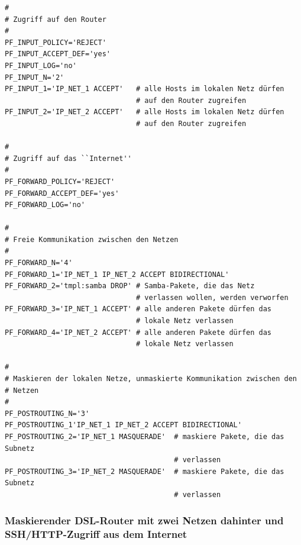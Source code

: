 \begin{example}
\begin{verbatim}
#
# Zugriff auf den Router
#
PF_INPUT_POLICY='REJECT'
PF_INPUT_ACCEPT_DEF='yes'
PF_INPUT_LOG='no'
PF_INPUT_N='2'
PF_INPUT_1='IP_NET_1 ACCEPT'   # alle Hosts im lokalen Netz dürfen
                               # auf den Router zugreifen
PF_INPUT_2='IP_NET_2 ACCEPT'   # alle Hosts im lokalen Netz dürfen
                               # auf den Router zugreifen

#
# Zugriff auf das ``Internet''
#
PF_FORWARD_POLICY='REJECT'
PF_FORWARD_ACCEPT_DEF='yes'
PF_FORWARD_LOG='no'

#
# Freie Kommunikation zwischen den Netzen
#
PF_FORWARD_N='4'
PF_FORWARD_1='IP_NET_1 IP_NET_2 ACCEPT BIDIRECTIONAL'
PF_FORWARD_2='tmpl:samba DROP' # Samba-Pakete, die das Netz
                               # verlassen wollen, werden verworfen
PF_FORWARD_3='IP_NET_1 ACCEPT' # alle anderen Pakete dürfen das
                               # lokale Netz verlassen
PF_FORWARD_4='IP_NET_2 ACCEPT' # alle anderen Pakete dürfen das
                               # lokale Netz verlassen

#
# Maskieren der lokalen Netze, unmaskierte Kommunikation zwischen den
# Netzen
#
PF_POSTROUTING_N='3'
PF_POSTROUTING_1'IP_NET_1 IP_NET_2 ACCEPT BIDIRECTIONAL'
PF_POSTROUTING_2='IP_NET_1 MASQUERADE'  # maskiere Pakete, die das Subnetz
                                        # verlassen
PF_POSTROUTING_3='IP_NET_2 MASQUERADE'  # maskiere Pakete, die das Subnetz
                                        # verlassen
\end{verbatim}
\end{example}

\subsubsection{Maskierender DSL-Router mit zwei Netzen dahinter und
SSH/HTTP-Zugriff aus dem Internet}

